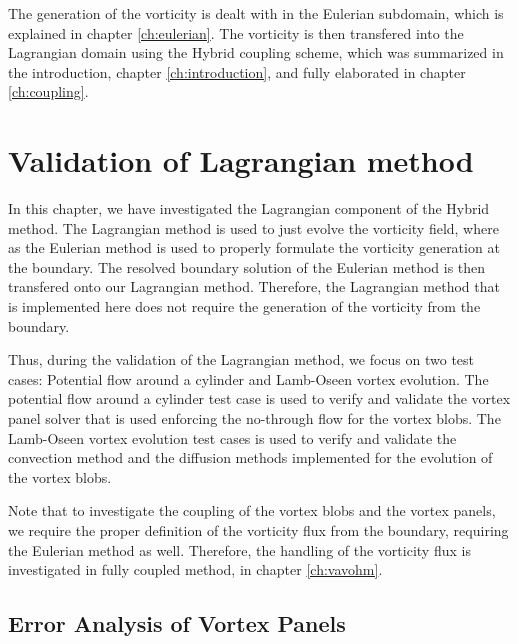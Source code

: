 The generation of the vorticity is dealt with in the Eulerian subdomain, which is explained in chapter \ref{ch:eulerian}. The vorticity is then transfered into the Lagrangian domain using the Hybrid coupling scheme, which was summarized in the introduction, chapter \ref{ch:introduction}, and fully elaborated in chapter \ref{ch:coupling}.

%
\section{Validation of Lagrangian method}
\label{sec:volm}
In this chapter, we have investigated the Lagrangian component of the Hybrid method. The Lagrangian method is used to just evolve the vorticity field, where as the Eulerian method is used to properly formulate the vorticity generation at the boundary. The resolved boundary solution of the Eulerian method is then transfered onto our Lagrangian method. Therefore, the Lagrangian method that is implemented here does not require the generation of the vorticity from the boundary. 

Thus, during the validation of the Lagrangian method, we focus on two test cases: Potential flow around a cylinder and Lamb-Oseen vortex evolution. The potential flow around a cylinder test case is used to verify and validate the vortex panel solver that is used enforcing the no-through flow for the vortex blobs. The Lamb-Oseen vortex evolution test cases is used to verify and validate the convection method and the diffusion methods implemented for the evolution of the vortex blobs.

Note that to investigate the coupling of the vortex blobs and the vortex panels, we require the proper definition of the vorticity flux from the boundary, requiring the Eulerian method as well. Therefore, the handling of the vorticity flux is investigated in fully coupled method, in chapter \ref{ch:vavohm}.


\subsection{Error Analysis of Vortex Panels}


